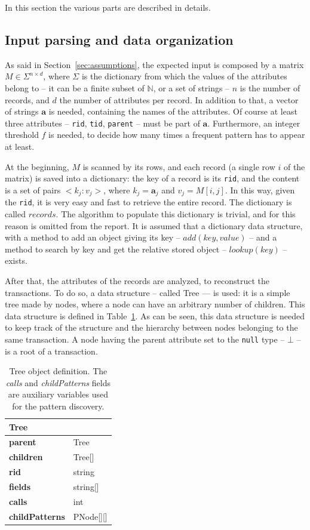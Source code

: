 \documentclass{acm_proc_article-sp-sigmod09}
\begin{document}
In this section the various parts are described in details.

\subsection{Input parsing and data organization}
As said in Section~\ref{sec:assumptions}, the expected input is composed by a matrix $M \in \Sigma^{n \times d}$, where $\Sigma$ is the dictionary from which the values of the attributes belong to -- it can be a finite subset of $\mathbb{N}$, or a set of strings -- $n$ is the number of records, and $d$ the number of attributes per record. In addition to that, a vector of strings $\boldsymbol{a}$ is needed, containing the names of the attributes. Of course at least three attributes -- \texttt{rid}, \texttt{tid}, \texttt{parent} -- must be part of $\boldsymbol{a}$. Furthermore, an integer threshold $f$ is needed, to decide how many times a frequent pattern has to appear at least.

At the beginning, $M$ is scanned by its rows, and each record (a single row $i$ of the matrix) is saved into a dictionary: the key of a record is its \texttt{rid}, and the content is a set of pairs $<k_j \colon v_j>$, where $k_j = \boldsymbol{a}_j$ and $v_j = M[i,j]$. In this way, given the \texttt{rid}, it is very easy and fast to retrieve the entire record. The dictionary is called $records$. The algorithm to populate this dictionary is trivial, and for this reason is omitted from the report. It is assumed that a dictionary data structure, with a method to add an object giving its key -- $add(key, value)$ -- and a method to search by key and get the relative stored object -- $lookup(key)$ -- exists.

After that, the attributes of the records are analyzed, to reconstruct the transactions. To do so, a data structure -- called Tree --- is used: it is a simple tree made by nodes, where a node can have an arbitrary number of children. This data structure is defined in Table~\ref{tab:tree}. As can be seen, this data structure is needed to keep track of the structure and the hierarchy between nodes belonging to the same transaction. A node having the parent attribute set to the \texttt{null} type -- $\bot$ -- is a root of a transaction.

\begin{table}[H]
\centering
\begin{tabular}{|ll|} \hline
\textbf{Tree} & \\ \hline
\textbf{parent} & Tree \\ \hline
\textbf{children} & Tree[] \\ \hline
\textbf{rid} & string \\ \hline
\textbf{fields} & string[] \\ \hline
\textbf{calls} & int \\ \hline
\textbf{childPatterns} & PNode[][] \\
\hline\end{tabular}
\caption{Tree object definition. The \emph{calls} and \emph{childPatterns} fields are auxiliary variables used for the pattern discovery.}
\label{tab:tree}
\end{table}
\end{document}
